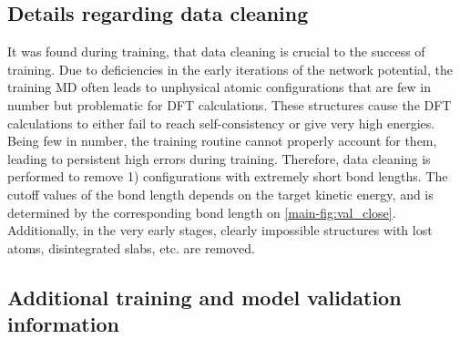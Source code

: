 \documentclass[manuscript=cmatex]{achemso}
\begin{document}
\subsection{Details regarding data cleaning}
It was found during training, that data cleaning is crucial to the success of training. Due to deficiencies in the early iterations of the network potential, the training MD often leads to unphysical atomic configurations that are few in number but problematic for DFT calculations. These structures cause the DFT calculations to either fail to reach self-consistency or give very high energies. Being few in number, the training routine cannot properly account for them, leading to persistent high errors during training. Therefore, data cleaning is performed to remove 1) configurations with extremely short bond lengths. The cutoff values of the bond length depends on the target kinetic energy, and is determined by the corresponding bond length on \cref{main-fig:val_close}. Additionally, in the very early stages, clearly impossible structures with lost  atoms, disintegrated slabs, etc. are removed. 
\subsection{Additional training and model validation information}
\end{document}
